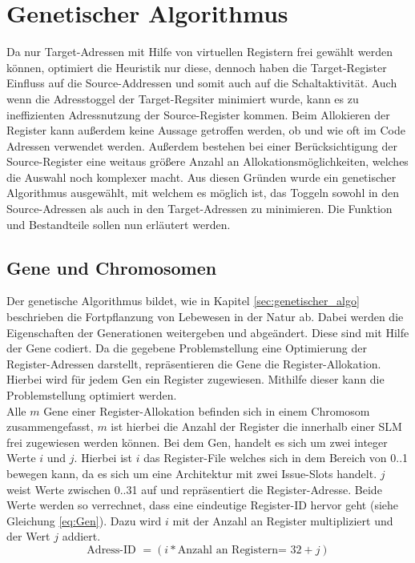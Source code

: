 \section{Genetischer Algorithmus}
\label{sec:genetischerAlgorithmus}
Da nur Target-Adressen mit Hilfe von virtuellen Registern frei gewählt werden können, optimiert die Heuristik nur diese, dennoch haben die Target-Register Einfluss auf die Source-Addressen und somit auch auf die Schaltaktivität. Auch wenn die Adresstoggel der Target-Regsiter minimiert wurde, kann es zu ineffizienten Adressnutzung der Source-Register kommen. Beim Allokieren der Register kann außerdem keine Aussage getroffen werden, ob und wie oft im Code Adressen verwendet werden.  Außerdem bestehen bei einer Berücksichtigung der Source-Register eine weitaus größere Anzahl an Allokationsmöglichkeiten, welches die Auswahl noch komplexer macht. Aus diesen Gründen wurde ein genetischer Algorithmus ausgewählt, mit welchem es möglich ist, das Toggeln sowohl in den Source-Adressen als auch in den Target-Adressen zu minimieren. Die Funktion und Bestandteile sollen nun erläutert werden.

\subsection{Gene und Chromosomen}
Der genetische Algorithmus bildet, wie in Kapitel \ref{sec:genetischer_algo} beschrieben die Fortpflanzung von Lebewesen in der Natur ab. Dabei werden die Eigenschaften der Generationen weitergeben und abgeändert. Diese sind mit Hilfe der Gene codiert. Da die gegebene Problemstellung eine Optimierung der Register-Adressen darstellt, repräsentieren die Gene die Register-Allokation. Hierbei wird für jedem Gen ein Register zugewiesen. Mithilfe dieser kann die Problemstellung optimiert werden.\\ 
Alle $m$ Gene einer Register-Allokation befinden sich in einem Chromosom zusammengefasst, $m$ ist hierbei die Anzahl der Register die innerhalb einer SLM frei zugewiesen werden können. Bei dem Gen, handelt es sich um zwei integer Werte $i$ und $j$. Hierbei ist $i$ das Register-File welches sich in dem Bereich von 0..1 bewegen kann, da es sich um eine Architektur mit zwei Issue-Slots handelt. $j$ weist Werte zwischen 0..31 auf und repräsentiert die Register-Adresse. Beide Werte werden so verrechnet, dass eine eindeutige Register-ID hervor geht (siehe Gleichung \ref{eq:Gen}). Dazu wird $i$ mit der Anzahl an Register multipliziert und der Wert $j$ addiert. 
\begin{equation}
\text{Adress-ID }= (i* \text{Anzahl an Registern= 32}+ j)
\label{eq:Gen}
\end{equation}
 
